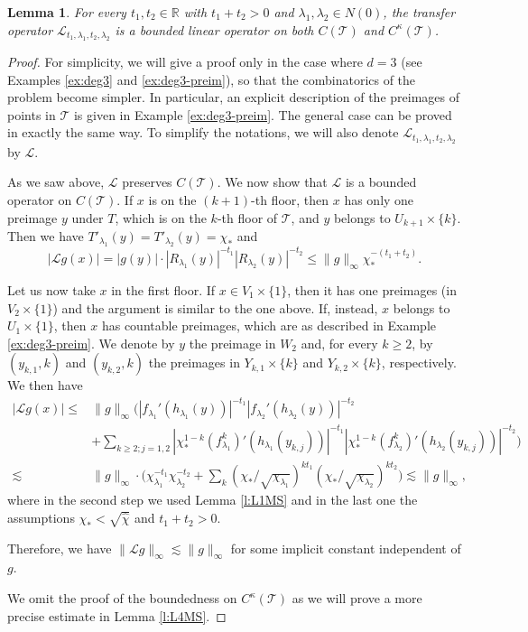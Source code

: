 \documentclass[11pt]{amsart}
\theoremstyle{plain}
\newtheorem{lem}[thm]{Lemma}
\theoremstyle{definition}
\theoremstyle{remark}
\begin{document}
\begin{lem}\label{l:cont-L}
For every $t_1, t_2\in\mathbb R$ with $t_1+t_2 >0$
and $\lambda_1, \lambda_2 \in N(0)$, the transfer operator $\mathcal L_{t_1,\lambda_1, t_2, \lambda_2}$
is a bounded linear operator on both $C(\mathcal T)$ and $C^{\kappa} (\mathcal T)$.
\end{lem}

\begin{proof}
For simplicity, we will give a proof only in the case where $d=3$
(see Examples \ref{ex:deg3} and \ref{ex:deg3-preim}),
so that the combinatorics of the problem become simpler. 
In particular, an explicit description of the preimages of points in $\mathcal T$ is given in Example \ref{ex:deg3-preim}.
The general case can be proved in exactly the same way. To simplify the notations,
we will also denote 
$\mathcal L_{t_1, \lambda_1, t_2, \lambda_2}$ by $\mathcal L$.


\medskip


As we saw above, 
$\mathcal L$
preserves $C (\mathcal T)$. 
We now show that
$\mathcal L$
is a bounded operator on $C(\mathcal{T})$. 
If $x$ is on the $(k+1)$-th floor, then 
$x$ has only one preimage $y$ under $T$, 
which is on the $k$-th floor of $\mathcal T$, and 
$y$ belongs to $U_{k+1} \times \{k\}$.
Then we have
$T'_{\lambda_1}(y) =
T'_{\lambda_2}(y) =\chi_*$ and $$|\mathcal{L}
g(x)| = |g(y)|\cdot
|R_{\lambda_1}(y)|^{-t_1} 
|R_{\lambda_2}(y)|^{-t_2} 
\le \|g\|_\infty \chi_*^{-(t_1+t_2)}.$$


Let us now take $x$ in the first floor. If $x\in V_1\times \{1\}$, then it has one preimages (in $V_2 \times \{1\}$)
and
the argument is similar to the one above.
If, instead, $x$ 
belongs to $U_1 \times \{1\}$,
then
$x$ 
has countable preimages, which 
are as described in Example \ref{ex:deg3-preim}. We denote by $y$
 the preimage in $W_2$ and,
 for every $k\geq 2$,
 by $(y_{k,1},k)$
 and $(y_{k,2},k)$
 the preimages in 
 $Y_{k,1}\times \{k\}$
 and 
 $Y_{k,2}\times \{k\}$, respectively.
We then have
\[
\begin{aligned}
|\mathcal{L}
g(x)| 
 \le & 
 \|g\|_\infty 
\Big(
|f_{\lambda_1}'(h_{\lambda_1}(y))|^{-t_1}
|f_{\lambda_2}'(h_{\lambda_2}(y))|^{-t_2}\\
& +\sum_{k\geq 2; j=1,2} 
|
\chi_*^{1-k}
(f_{\lambda_1}^k)'(h_{\lambda_1}(y_{k,j}))|^{-t_1}
|
\chi_*^{1-k}
(f_{\lambda_2}^k)'(h_{\lambda_2}(y_{k,j}))|^{-t_2}
\Big)\\
 \lesssim &
\|g\|_\infty \cdot 
\big(
\chi_{\lambda_1}^{-t_1}
\chi_{\lambda_2}^{-t_2}
+ \sum_{k}
(\chi_*/\sqrt{\chi_{\lambda_1}})^{kt_1}
(\chi_*/\sqrt{\chi_{\lambda_2}})^{kt_2}
\big)\lesssim \|g\|_\infty,
\end{aligned}\]
where in the second step
we used Lemma \ref{l:L1MS} and
in the last one 
the assumptions $\chi_* < \sqrt{\hat \chi}$ and $t_1+t_2>0$.

Therefore, we have
$\|\mathcal{L}
g\|_\infty 
\lesssim \|g\|_\infty $ 
for some implicit constant independent of $g$.

\medskip

We omit the proof of the boundedness on $C^\kappa (\mathcal T)$ as we will prove a more precise estimate in Lemma \ref{l:L4MS}.
\end{proof}
\end{document}
